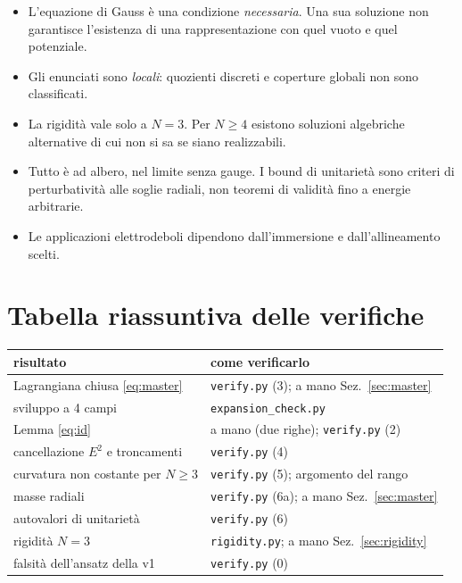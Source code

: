 \documentclass[11pt,a4paper]{article}
\numberwithin{equation}{section}
\theoremstyle{remark}
\begin{document}
\begin{itemize}
\item L'equazione di Gauss è una condizione \emph{necessaria}. Una sua soluzione non garantisce l'esistenza di una rappresentazione con quel vuoto e quel potenziale.
\item Gli enunciati sono \emph{locali}: quozienti discreti e coperture globali non sono classificati.
\item La rigidità vale solo a $N=3$. Per $N\ge4$ esistono soluzioni algebriche alternative di cui non si sa se siano realizzabili.
\item Tutto è ad albero, nel limite senza gauge. I bound di unitarietà sono criteri di perturbatività alle soglie radiali, non teoremi di validità fino a energie arbitrarie.
\item Le applicazioni elettrodeboli dipendono dall'immersione e dall'allineamento scelti.
\end{itemize}

\section{Tabella riassuntiva delle verifiche}

\begin{center}
\begin{tabular}{ll}
\hline
risultato & come verificarlo\\
\hline
Lagrangiana chiusa \eqref{eq:master} & \texttt{verify.py} (3); a mano Sez.~\ref{sec:master}\\
sviluppo a 4 campi & \texttt{expansion\_check.py}\\
Lemma \eqref{eq:id} & a mano (due righe); \texttt{verify.py} (2)\\
cancellazione $E^2$ e troncamenti & \texttt{verify.py} (4)\\
curvatura non costante per $N\ge3$ & \texttt{verify.py} (5); argomento del rango\\
masse radiali & \texttt{verify.py} (6a); a mano Sez.~\ref{sec:master}\\
autovalori di unitarietà & \texttt{verify.py} (6)\\
rigidità $N=3$ & \texttt{rigidity.py}; a mano Sez.~\ref{sec:rigidity}\\
falsità dell'ansatz della v1 & \texttt{verify.py} (0)\\
\hline
\end{tabular}
\end{center}
\end{document}
